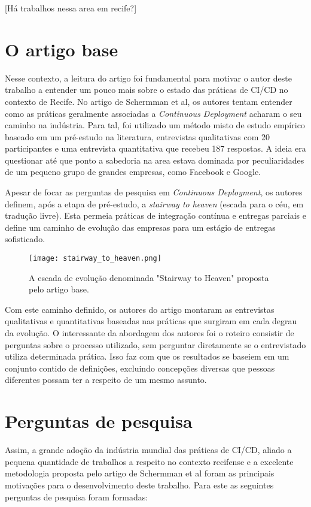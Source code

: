 [Há trabalhos nessa area em recife?]

\section{O artigo base}
Nesse contexto, a leitura do artigo \cite{empiricalStudy2016} foi fundamental para motivar o autor deste trabalho a entender um pouco mais sobre o estado das práticas de CI/CD no contexto de Recife. No artigo de Schermman et al, os autores tentam entender como as práticas geralmente associadas a \emph{Continuous Deployment} acharam o seu caminho na indústria. Para tal, foi utilizado um método misto de estudo empírico baseado em um pré-estudo na literatura, entrevistas qualitativas com 20 participantes e uma entrevista quantitativa que recebeu 187 respostas. A ideia era questionar até que ponto a sabedoria na area estava dominada por peculiaridades de um pequeno grupo de grandes empresas, como Facebook e Google.

Apesar de focar as perguntas de pesquisa em \emph{Continuous Deployment}, os autores definem, após a etapa de pré-estudo, a \emph{stairway to heaven} (escada para o céu, em tradução livre). Esta  permeia práticas de integração contínua e entregas parciais e define um caminho de evolução das empresas para um estágio de entregas sofisticado. 

\begin{figure}[ht]
\begin{center}
\texttt{[image: stairway\_to\_heaven.png]}
\end{center}
\caption[Stairway to Heaven]{
    A escada de evolução denominada "Stairway to Heaven" proposta pelo artigo base.
}\label{fig_exe}
\end{figure}

Com este caminho definido, os autores do artigo montaram as entrevistas qualitativas e quantitativas baseadas nas práticas que surgiram em cada degrau da evolução. O interessante da abordagem dos autores foi o roteiro consistir de perguntas sobre o processo utilizado, sem perguntar diretamente se o entrevistado utiliza determinada prática. Isso faz com que os resultados se baseiem em um conjunto contido de definições, excluindo concepções diversas que pessoas diferentes possam ter a respeito de um mesmo assunto.

\section{Perguntas de pesquisa} 
Assim, a grande adoção da indústria mundial das práticas de CI/CD, aliado a pequena quantidade de trabalhos a respeito no contexto recifense e a excelente metodologia proposta pelo artigo de Schermman et al \cite{empiricalStudy2016} foram as principais motivações para o desenvolvimento deste trabalho. Para este as seguintes perguntas de pesquisa foram formadas:

